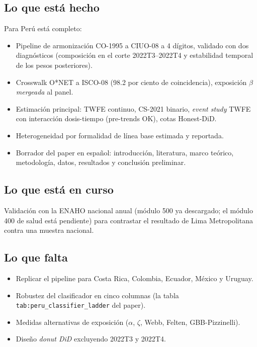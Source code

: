 \documentclass[12pt]{article}
\begin{document}
\subsection{Lo que está hecho}

Para Perú está completo:

\begin{itemize}
  \item Pipeline de armonización CO-1995 a CIUO-08 a 4 dígitos, validado con dos diagnósticos (composición en el corte 2022T3--2022T4 y estabilidad temporal de los pesos posteriores).
  \item Crosswalk O*NET a ISCO-08 (98.2 por ciento de coincidencia), exposición $\beta$ \emph{mergeada} al panel.
  \item Estimación principal: TWFE continuo, CS-2021 binario, \emph{event study} TWFE con interacción dosis-tiempo (pre-trends OK), cotas Honest-DiD.
  \item Heterogeneidad por formalidad de línea base estimada y reportada.
  \item Borrador del paper en español: introducción, literatura, marco teórico, metodología, datos, resultados y conclusión preliminar.
\end{itemize}

\subsection{Lo que está en curso}

Validación con la ENAHO nacional anual (módulo 500 ya descargado; el módulo 400 de salud está pendiente) para contrastar el resultado de Lima Metropolitana contra una muestra nacional.

\subsection{Lo que falta}

\begin{itemize}
  \item Replicar el pipeline para Costa Rica, Colombia, Ecuador, México y Uruguay.
  \item Robustez del clasificador en cinco columnas (la tabla \texttt{tab:peru\_classifier\_ladder} del paper).
  \item Medidas alternativas de exposición ($\alpha$, $\zeta$, Webb, Felten, GBB-Pizzinelli).
  \item Diseño \emph{donut DiD} excluyendo 2022T3 y 2022T4.
\end{itemize}
\end{document}
